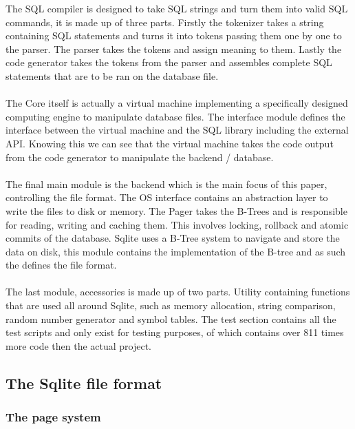 The SQL compiler is designed to take SQL strings and turn them into valid SQL commands, it is made up of three parts. Firstly the tokenizer takes a string containing SQL statements and turns it into tokens passing them one by one to the parser. The parser takes the tokens and assign meaning to them. Lastly the code generator takes the tokens from the parser and assembles complete SQL statements that are to be ran on the database file.
\\\\
The Core itself is actually a virtual machine implementing a specifically designed computing engine to manipulate database files. The interface module defines the interface between the virtual machine and the SQL library including the external API. Knowing this we can see that the virtual machine takes the code output from the code generator to manipulate the backend / database. 
\\\\
The final main module is the backend which is the main focus of this paper, controlling the file format. The OS interface contains an abstraction layer to write the files to disk or memory. The Pager takes the B-Trees and is responsible for reading, writing and caching them. This involves locking, rollback and atomic commits of the database. Sqlite uses a B-Tree system to navigate and store the data on disk, this module contains the implementation of the B-tree and as such the defines the file format. 
\\\\
The last module, accessories is made up of two parts. Utility containing functions that are used all around Sqlite, such as memory allocation, string comparison, random number generator and symbol tables. The test section contains all the test scripts and only exist for testing purposes, of which contains over 811 times more code then the actual project.

\subsection{The Sqlite file format}
\label{subsec:sqlite_file_format}

\subsubsection{The page system}
\label{subsubsec:sqlite_page_system}

